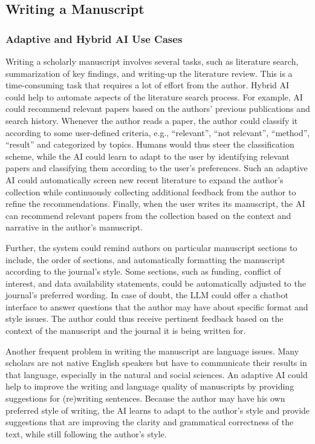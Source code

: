 \subsection{Writing a Manuscript}

\subsubsection*{Adaptive and Hybrid AI Use Cases}
Writing a scholarly manuscript involves several tasks, such as literature search, summarization of key findings, and writing-up the
literature review. This is a time-consuming task that requires a lot of effort from the author. Hybrid AI could help to automate aspects
of the literature search process. For example, AI could recommend relevant papers based on the authors' previous publications and search
history. Whenever the author reads a paper, the author could classify it according to some user-defined criteria, e.g., ``relevant'',
``not relevant'', ``method'', ``result'' and categorized by topics. Humans would thus steer the classification scheme, while the AI could
learn to adapt to the user by identifying relevant papers and classifying them according to the user's preferences. Such an adaptive AI
could automatically screen new recent literature to expand the author's collection while continuously collecting additional feedback from
the author to refine the recommendations. Finally, when the user writes its manuscript, the AI can recommend relevant papers from the
collection based on the context and narrative in the author's manuscript.

Further, the system could remind authors
on particular manuscript sections to include, the order of sections, and automatically formatting the manuscript according to the journal's
style. Some sections, such as funding, conflict of interest, and data availability statements, could be automatically adjusted to the journal's 
preferred wording. In case of doubt, the LLM could offer a chatbot interface to answer questions that the author may have about specific format
and style issues. The author could thus receive pertinent feedback based on the context of the manuscript and the journal it is being 
written for.

Another frequent problem in writing the manuscript are language issues. Many scholars are not native English speakers but have to
communicate their results in that language, especially in the natural and social sciences. An adaptive AI could help to improve the
writing and language quality of manuscripts by providing suggestions for (re)writing sentences. Because the author may have his own
preferred style of writing, the AI learns to adapt to the author's style and provide suggestions that are improving the clarity and
grammatical correctness of the text, while still following the author's style. 

